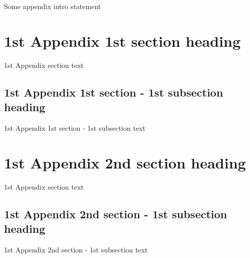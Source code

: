 Some appendix intro statement

\section[1st Appendix 1st section ToC title]{1st Appendix 1st section heading}

1st Appendix section text

\subsection[1st Appendix 1st section - 1st subsection ToC title]{1st Appendix 1st section - 1st subsection heading}

1st Appendix 1st section - 1st subsection text

\section[1st Appendix 2nd section ToC title]{1st Appendix 2nd section heading}

1st Appendix section text

\subsection[1st Appendix 2nd section - 1st subsection ToC title]{1st Appendix 2nd section - 1st subsection heading}

1st Appendix 2nd section - 1st subsection text

\endinput
